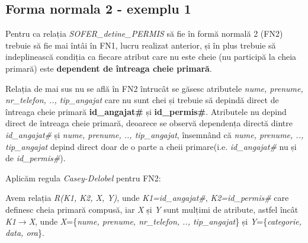 \documentclass[12pt, a4paper]{article}
\begin{document}
\begin{table}[!htbp]
\caption{Transformarea în FN1}\label{tab2}
\end{table}

\subsection*{Forma normala 2 - exemplu 1}
Pentru ca relația \emph{SOFER\_detine\_PERMIS} să fie în formă normală 2 (FN2) trebuie să fie mai întâi în FN1, lucru realizat anterior, și în plus trebuie să indeplinească condiția ca fiecare atribut care nu este cheie (nu participă la cheia primară) este \textbf{dependent de întreaga cheie primară}.

Relația de mai sus nu se află în FN2 întrucât se găsesc atributele \emph{nume, prenume, nr\_telefon, .., tip\_angajat} care nu sunt chei și trebuie să depindă direct de întreaga cheie primară \textbf{id\_angajat\#} și \textbf{id\_permis\#}. Atributele nu depind direct de întreaga cheie primară, deoarece se observă dependența directă dintre \emph{id\_angajat\#} și \emph{nume, prenume, .., tip\_angajat}, însemnând că \emph{nume, prenume, .., tip\_angajat} depind direct doar de o parte a cheii primare(i.e. \emph{id\_angajat\#} nu și de \emph{id\_permis\#}).

Aplicăm regula \emph{Casey-Delobel} pentru FN2:

Avem relația \emph{R(K1, K2, X, Y)}, unde \emph{K1=id\_angajat\#}, \emph{K2=id\_permis\#} care definesc cheia primară compusă, iar \emph{X} și \emph{Y} sunt mulțimi de atribute, astfel încât \emph{K1}$\rightarrow$\emph{X}, unde \emph{X}=\{\emph{nume, prenume, nr\_telefon, .., tip\_angajat}\} și \emph{Y}=\{\emph{categorie, data, ora}\}.
\end{document}

